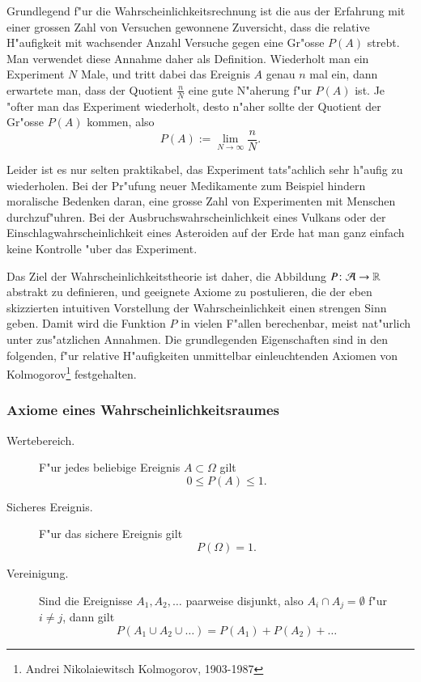 Grundlegend f"ur die Wahrscheinlichkeitsrechnung ist die aus der
Erfahrung mit einer grossen Zahl von Versuchen gewonnene Zuversicht,
dass die relative H"aufigkeit mit wachsender Anzahl Versuche gegen
eine Gr"osse $P(A)$ strebt.
Man verwendet diese Annahme daher als Definition.
Wiederholt man ein Experiment $N$ Male, und tritt dabei das Ereignis $A$
genau $n$ mal ein, dann erwartete man, dass der Quotient $\frac{n}{N}$
eine gute N"aherung f"ur $P(A)$ ist.
Je "ofter man das Experiment
wiederholt, desto n"aher sollte der Quotient der Gr"osse $P(A)$
kommen, also
\[
P(A) := \lim_{N\to\infty}\frac{n}{N}.
\]

Leider ist es nur selten praktikabel, das Experiment tats"achlich
sehr h"aufig zu wiederholen.
Bei der Pr"ufung neuer Medikamente
zum Beispiel hindern moralische Bedenken daran, eine grosse
Zahl von Experimenten mit Menschen durchzuf"uhren.
Bei der
Ausbruchswahrscheinlichkeit eines Vulkans oder der
Einschlagwahrscheinlichkeit eines Asteroiden auf der Erde hat man
ganz einfach keine Kontrolle "uber das Experiment.

Das Ziel der Wahrscheinlichkeitstheorie ist daher, 
die Abbildung $P\colon {\cal A}\to\mathbb{R}$
abstrakt zu definieren, und geeignete Axiome zu postulieren, die
der eben skizzierten intuitiven Vorstellung der Wahrscheinlichkeit
einen strengen Sinn geben.
Damit wird die Funktion $P$ in vielen
F"allen berechenbar, meist nat"urlich unter zus"atzlichen Annahmen.
Die grundlegenden Eigenschaften sind in den folgenden, f"ur
relative H"aufigkeiten unmittelbar einleuchtenden Axiomen
von Kolmogorov\footnote{Andrei Nikolaiewitsch Kolmogorov, 1903-1987}
festgehalten.

\subsubsection{Axiome  eines Wahrscheinlichkeitsraumes}

\begin{description}
\item[Wertebereich.]F"ur jedes beliebige Ereignis $A\subset \Omega$
gilt
\begin{equation}
0\le P(A)\le 1.
\label{p-wertebereich}
\end{equation}
\item[Sicheres Ereignis.] F"ur das sichere Ereignis gilt
\begin{equation}
P(\Omega) = 1.
\label{p-sicheresereignis}
\end{equation}
\item[Vereinigung.] Sind die Ereignisse $A_1,A_2,\dots$ paarweise
disjunkt, also $A_i\cap A_j=\emptyset$ f"ur $i\ne j$, dann gilt
\begin{equation}
P(A_1\cup A_2\cup \dots) = P(A_1) + P(A_2) + \dots
\label{p-summenformel}
\end{equation}
\end{description}

